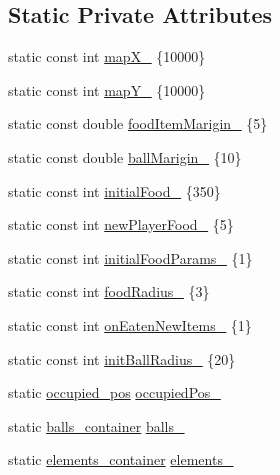 \subsection*{Static Private Attributes}
\begin{DoxyCompactItemize}
\item 
static const int \hyperlink{classwebsocket_1_1GameBoard_a02d0925d31cf26c6853cbb39de6f051c}{map\+X\+\_\+} \{10000\}
\item 
static const int \hyperlink{classwebsocket_1_1GameBoard_a60432d0d991c965b75ad2557e9610425}{map\+Y\+\_\+} \{10000\}
\item 
static const double \hyperlink{classwebsocket_1_1GameBoard_a1bedb4dff215404c5574f064c68789c8}{food\+Item\+Marigin\+\_\+} \{5\}
\item 
static const double \hyperlink{classwebsocket_1_1GameBoard_add182baa81ccbe72610eebacdb0b8dd6}{ball\+Marigin\+\_\+} \{10\}
\item 
static const int \hyperlink{classwebsocket_1_1GameBoard_ad2f7ea28ea20d8d16f06135cc09b92e1}{initial\+Food\+\_\+} \{350\}
\item 
static const int \hyperlink{classwebsocket_1_1GameBoard_aad2445e5c98fe42f37e71c15ca3c57c9}{new\+Player\+Food\+\_\+} \{5\}
\item 
static const int \hyperlink{classwebsocket_1_1GameBoard_a80f3a0b794866a7e3c9dac0bf15ba14a}{initial\+Food\+Params\+\_\+} \{1\}
\item 
static const int \hyperlink{classwebsocket_1_1GameBoard_a7277b9cbeca558d4bcfad3c24d185336}{food\+Radius\+\_\+} \{3\}
\item 
static const int \hyperlink{classwebsocket_1_1GameBoard_a8fe312bcfc33ae3d624a0fdb02f40622}{on\+Eaten\+New\+Items\+\_\+} \{1\}
\item 
static const int \hyperlink{classwebsocket_1_1GameBoard_a0644b0415ab9a8f4a260e277fca79e1a}{init\+Ball\+Radius\+\_\+} \{20\}
\item 
static \hyperlink{classwebsocket_1_1GameBoard_ab68a03a083cfa75e7d5b21fe0c13eda3}{occupied\+\_\+pos} \hyperlink{classwebsocket_1_1GameBoard_aca1010defacfdd0ea5f032035ce7105e}{occupied\+Pos\+\_\+}
\item 
static \hyperlink{classwebsocket_1_1GameBoard_a49ec88dacda0efb3448649503967e07d}{balls\+\_\+container} \hyperlink{classwebsocket_1_1GameBoard_a8bdb65edb9742890aa150d5c7c5b7209}{balls\+\_\+}
\item 
static \hyperlink{classwebsocket_1_1GameBoard_a6340e99ab84e0fc9ee504f5874073c0c}{elements\+\_\+container} \hyperlink{classwebsocket_1_1GameBoard_a56fd12d10af951e1f6a42a18f4ccfe35}{elements\+\_\+}

\end{DoxyCompactItemize}
